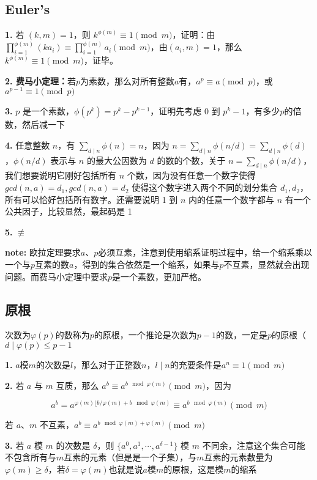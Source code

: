 \documentclass{article}
\begin{document}
\subsection{Euler's}

\textbf{1.} 若 $(k,m)=1$，则 $k^{\phi(m)}\equiv 1\pmod m$，证明：由 $\prod_{i=1}^{\phi(m)}(ka_i)\equiv \prod_{i=1}^{\phi(m)}a_i\pmod m$，由$(a_i,m)=1$，那么$k^{\phi(m)}\equiv 1\pmod m$，证毕。

\textbf{2. 费马小定理：}若$p$为素数，那么对所有整数$a$有，$a^p\equiv a\pmod p$，或$a^{p-1}\equiv 1\pmod p$

\textbf{3.} $p$ 是一个素数，$\phi(p^k)=p^k-p^{k-1}$，证明先考虑 0 到 $p^k-1$，有多少$p$的倍数，然后减一下

\textbf{4.} 任意整数 $n$，有 $\sum_{d\mid n}\phi(n)=n$，因为 $n=\sum_{d\mid n}\phi(n/d)=\sum_{d\mid n}\phi(d)$，$\phi(n/d)$ 表示与 $n$ 的最大公因数为 $d$ 的数的个数，关于 $n=\sum_{d\mid n}\phi(n/d)$，我们想要说明它刚好包括所有 $n$ 个数，因为没有任意一个数字使得 $gcd(n, a)=d_1,gcd(n,a)=d_2$ 使得这个数字进入两个不同的划分集合 $d_1, d_2$，所有可以恰好包括所有数字。还需要说明 1 到 $n$ 内的任意一个数字都与 $n$ 有一个公共因子，比较显然，最起码是 1

\textbf{5.} $\not\equiv$

\textbf{note: }欧拉定理要求$a、p$必须互素，注意到使用缩系证明过程中，给一个缩系乘以一个与$p$互素的数$a$，得到的集合依然是一个缩系，如果与$p$不互素，显然就会出现问题。而费马小定理中要求$p$是一个素数，更加严格。


\subsection{原根}

次数为$\varphi(p)$的数称为$p$的原根，一个推论是次数为$p-1$的数，一定是$p$的原根（$d\mid \varphi(p)\le p-1$

\textbf{1.} $a$模$m$的次数是$l$，那么对于正整数$n$，$l\mid n$的充要条件是$a^n\equiv 1\pmod m$

\textbf{2.} 若 $a$ 与 $m$ 互质，那么 $a^b\equiv a^{b\mod \varphi(m)}\pmod m$，因为

\begin{equation}
    a^b = a^{\varphi(m)\lfloor b/\varphi(m) + b\mod{\varphi(m)}}\equiv a^{b\mod{\varphi(m)}}\pmod m
    \nonumber
\end{equation}

若 $a$、$m$ 不互素，$a^b\equiv a^{b\mod \varphi(m) + \varphi(m)}\pmod m$

\textbf{3.} 若 $a$ 模 $m$ 的次数是 $\delta$，则 $\{a^0,a^1,\cdots,a^{\delta -1}\}$ 模 $m$ 不同余，注意这个集合可能不包含所有与$m$互素的元素（但是是一个子集），与$m$互素的元素数量为$\varphi(m)\ge \delta$，若$\delta = \varphi(m)$也就是说$a$模$m$的原根，这是模$m$的缩系
\end{document}
